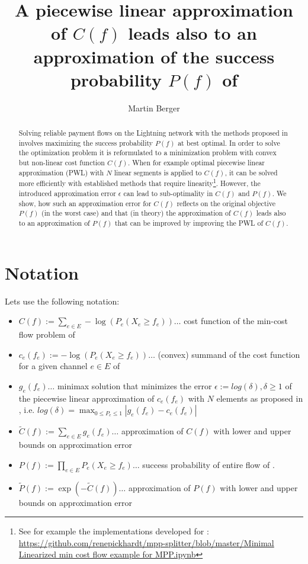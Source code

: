 \documentclass[10pt]{article}
\title{A piecewise linear approximation of $C(f)$ leads also to an approximation of the success probability $P(f)$ of \cite{DBLP:journals/corr/abs-2107-05322}}
\author{Martin Berger}
\begin{document}
 
\maketitle
 
\begin{abstract}
Solving reliable payment flows on the Lightning network with the methods proposed in \cite{DBLP:journals/corr/abs-2107-05322} involves maximizing the success probability $P(f)$ at best optimal. In order to solve the optimization problem it is reformulated to a minimization problem with convex but non-linear cost function $C(f)$. When for example optimal piecewise linear approximation (PWL) with $N$ linear segments \cite{Imamoto_optimalpiecewise} is applied to $C(f)$, it can be solved more efficiently with established methods that require linearity\footnote{See for example the implementations developed for \cite{DBLP:journals/corr/abs-2107-05322}: \url{https://github.com/renepickhardt/mpp-splitter/blob/master/Minimal Linearized min cost flow example for MPP.ipynb}}. However, the introduced approximation error $\epsilon$ can lead to sub-optimality in $C(f)$ and $P(f)$. We show, how such an approximation error for $C(f)$ reflects on the original objective $P(f)$ (in the worst case) and that (in theory) the approximation of $C(f)$ leads also to an approximation of $P(f)$ that can be improved by improving the PWL of $C(f)$.
\end{abstract}

\section{Notation}

Lets use the following notation:
\begin{itemize}
	\item $C(f) := \sum_{e\in E}-\log\left(P_e(X_e \geq f_e)\right) \ldots$ cost function of the min-cost flow problem of \cite{DBLP:journals/corr/abs-2107-05322}
	\item $c_e(f_e):=-\log\left(P_e(X_e\geq f_e)\right) \ldots$ (convex) summand of the cost function for a given channel $e\in E$ of \cite{DBLP:journals/corr/abs-2107-05322}
	\item $g_e(f_e) \ldots$ minimax solution that minimizes the error $\epsilon:=log\left(\delta\right), \delta \geq 1$ of the piecewise linear approximation of $c_e(f_e)$ with $N$ elements as proposed in \cite{Imamoto_optimalpiecewise}, i.e. $log\left(\delta\right)=\max_{0\leq P_e \leq 1}|g_e(f_e)-c_e(f_e)|$
	\item $\tilde{C}(f) := \sum_{e\in E} g_e(f_e) \ldots$ approximation of $C(f)$ with lower and upper bounds on approximation error
	\item $P(f):=\prod_{e\in E}P_e\left(X_{e} \geq f_e\right) \ldots$ success probability of entire flow of \cite{DBLP:journals/corr/abs-2107-05322}.
	\item $\tilde{P}(f):=\exp(-\tilde{C}(f)) \ldots$ approximation of $P(f)$ with lower and upper bounds on approximation error
\end{itemize}
\end{document}
